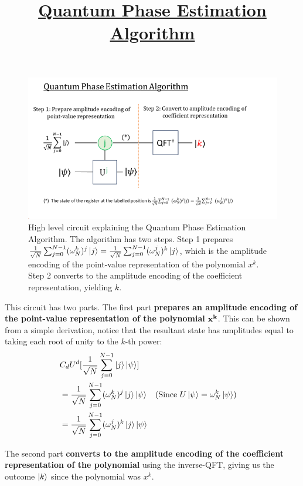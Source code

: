 \documentclass[12pt, a4paper]{article}
\begin{document}
	\begin{figure}
		\centering
		\title{\textbf{\underline{Quantum Phase Estimation Algorithm}}}
		\includegraphics{qpe_algorithm.png}
		\caption{High level circuit explaining the Quantum Phase Estimation Algorithm. The algorithm has two steps. Step 1 prepares $\frac{1}{\sqrt{N}}\sum_{j=0}^{N-1}  (\omega^{k}_N)^j \ket{j} = \frac{1}{\sqrt{N}}\sum_{j=0}^{N-1}  (\omega^{j}_N)^k \ket{j}$, which is the amplitude encoding of the point-value representation of the polynomial $x^k$. Step 2 converts to the amplitude encoding of the coefficient representation, yielding $k$.}
		\label{fig:qpealgorithm}
	\end{figure}
	
	
	This circuit has two parts. The first part \textbf{prepares an amplitude encoding of the point-value representation of the polynomial} $\bf{x^k}$. This can be shown from a simple derivation, notice that the resultant state has amplitudes equal to taking each root of unity to the $k$-th power: 
	\begin{align*}
		&C_dU^d [\frac{1}{\sqrt{N}}\sum_{j=0}^{N-1} \ket{j}\ket{\psi}] \\
		&=\frac{1}{\sqrt{N}}\sum_{j=0}^{N-1}  (\omega^{k}_N)^j \ket{j} \ket{\psi}  &&(\text{Since } U\ket{\psi} = \omega_N^k \ket{\psi})\\
		&=\frac{1}{\sqrt{N}}\sum_{j=0}^{N-1}  (\omega^{j}_N)^k \ket{j} \ket{\psi} \\
	\end{align*}
	
	The second part \textbf{converts to the amplitude encoding of the coefficient representation of the polynomial} using the inverse-QFT, giving us the outcome $\ket{k}$ since the polynomial was $x^k$. 
	
	
\end{document}
